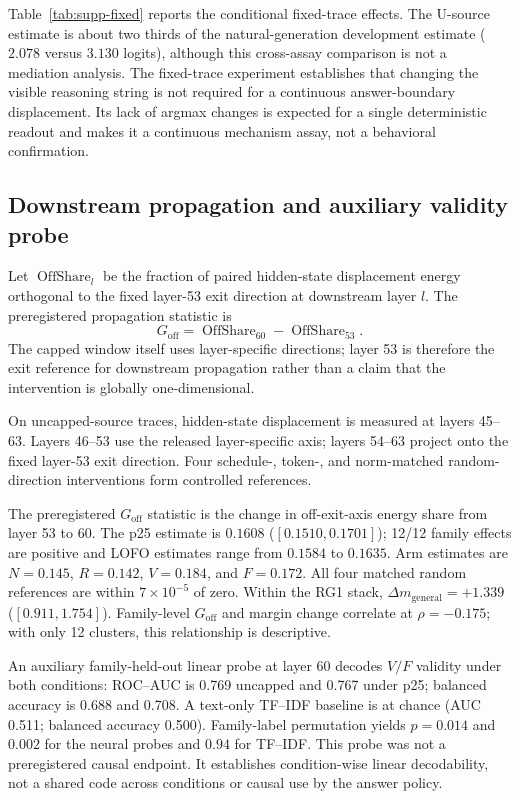 \documentclass[letterpaper]{article}
\begin{document}
Table~\ref{tab:supp-fixed} reports the conditional fixed-trace effects. The U-source estimate is about two thirds of the natural-generation development estimate ($2.078$ versus $3.130$ logits), although this cross-assay comparison is not a mediation analysis.  The fixed-trace experiment establishes that changing the visible reasoning string is not required for a continuous answer-boundary displacement.  Its lack of argmax changes is expected for a single deterministic readout and makes it a continuous mechanism assay, not a behavioral confirmation.

\subsection{Downstream propagation and auxiliary validity probe}

Let $\operatorname{OffShare}_l$ be the fraction of paired hidden-state displacement energy orthogonal to the fixed layer-53 exit direction at downstream layer $l$.  The preregistered propagation statistic is
\begin{equation}
G_{\mathrm{off}}=\operatorname{OffShare}_{60}-\operatorname{OffShare}_{53}.
\end{equation}
The capped window itself uses layer-specific directions; layer 53 is therefore the exit reference for downstream propagation rather than a claim that the intervention is globally one-dimensional.

On uncapped-source traces, hidden-state displacement is measured at layers 45--63.  Layers 46--53 use the released layer-specific axis; layers 54--63 project onto the fixed layer-53 exit direction.  Four schedule-, token-, and norm-matched random-direction interventions form controlled references.

The preregistered $G_{\mathrm{off}}$ statistic is the change in off-exit-axis energy share from layer 53 to 60.  The p25 estimate is $0.1608$ ($[0.1510,0.1701]$); 12/12 family effects are positive and LOFO estimates range from $0.1584$ to $0.1635$.  Arm estimates are $N=0.145$, $R=0.142$, $V=0.184$, and $F=0.172$.  All four matched random references are within $7\times10^{-5}$ of zero.  Within the RG1 stack, $\Delta m_{\mathrm{general}}=+1.339$ ($[0.911,1.754]$).  Family-level $G_{\mathrm{off}}$ and margin change correlate at $\rho=-0.175$; with only 12 clusters, this relationship is descriptive.

An auxiliary family-held-out linear probe at layer 60 decodes $V/F$ validity under both conditions: ROC--AUC is 0.769 uncapped and 0.767 under p25; balanced accuracy is 0.688 and 0.708.  A text-only TF--IDF baseline is at chance (AUC 0.511; balanced accuracy 0.500).  Family-label permutation yields $p=0.014$ and $0.002$ for the neural probes and $0.94$ for TF--IDF.  This probe was not a preregistered causal endpoint.  It establishes condition-wise linear decodability, not a shared code across conditions or causal use by the answer policy.
\end{document}
